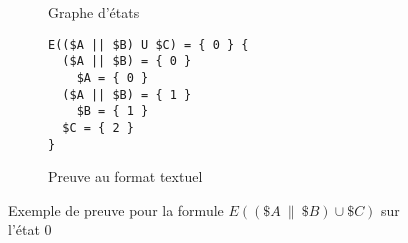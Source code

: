 \begin{figure}[H]
\centering
\begin{subfigure}[b]{.4\textwidth}
\centering
{}
\caption{Graphe d'états}
\end{subfigure}
\begin{subfigure}[b]{.4\textwidth}
\centering
\begin{minipage}{0.74\linewidth}
\begin{verbatim}
E(($A || $B) U $C) = { 0 } {
  ($A || $B) = { 0 }
    $A = { 0 }
  ($A || $B) = { 1 }
    $B = { 1 }
  $C = { 2 }
}
\end{verbatim}
\end{minipage}
\caption{Preuve au format textuel}
\end{subfigure}
\caption{Exemple de preuve pour la formule $E((\$A~\|~\$B) \cup \$C)$ sur l'état 0}
\label{fig:PreuveAffichageTextuelChemin}
\end{figure}